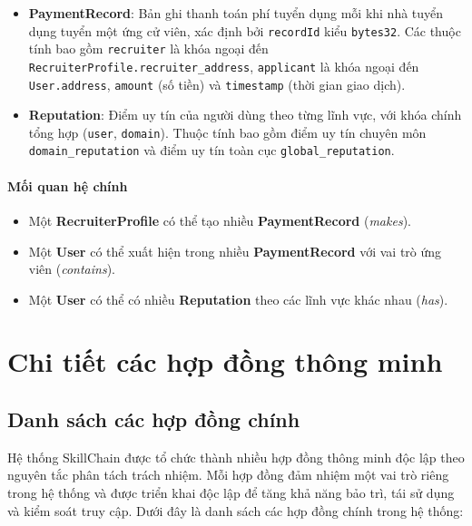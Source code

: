     \begin{itemize}
      \item \textbf{PaymentRecord}: Bản ghi thanh toán phí tuyển dụng mỗi khi nhà tuyển dụng tuyển một ứng cử viên, xác định bởi \texttt{recordId} kiểu \texttt{bytes32}. Các thuộc tính bao gồm \texttt{recruiter} là khóa ngoại đến \texttt{RecruiterProfile.recruiter\_address}, \texttt{applicant} là khóa ngoại đến \texttt{User.address}, \texttt{amount} (số tiền) và \texttt{timestamp} (thời gian giao dịch).
      \item \textbf{Reputation}: Điểm uy tín của người dùng theo từng lĩnh vực, với khóa chính tổng hợp (\texttt{user}, \texttt{domain}). Thuộc tính bao gồm điểm uy tín chuyên môn \texttt{domain\_reputation} và điểm uy tín toàn cục \texttt{global\_reputation}.
    \end{itemize}

  \paragraph{Mối quan hệ chính}
    \begin{itemize}
      \item Một \textbf{RecruiterProfile} có thể tạo nhiều \textbf{PaymentRecord} (\emph{makes}).
      \item Một \textbf{User} có thể xuất hiện trong nhiều \textbf{PaymentRecord} với vai trò ứng viên (\emph{contains}).
      \item Một \textbf{User} có thể có nhiều \textbf{Reputation} theo các lĩnh vực khác nhau (\emph{has}).
    \end{itemize}


\section{Chi tiết các hợp đồng thông minh}

\subsection{Danh sách các hợp đồng chính}

Hệ thống SkillChain được tổ chức thành nhiều hợp đồng thông minh độc lập theo nguyên tắc phân tách trách nhiệm. Mỗi hợp đồng đảm nhiệm một vai trò riêng trong hệ thống và được triển khai độc lập để tăng khả năng bảo trì, tái sử dụng và kiểm soát truy cập. Dưới đây là danh sách các hợp đồng chính trong hệ thống:

